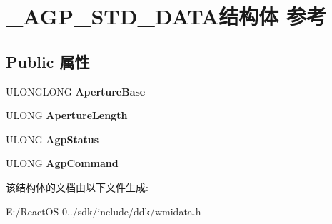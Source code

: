 \hypertarget{struct___a_g_p___s_t_d___d_a_t_a}{}\section{\+\_\+\+A\+G\+P\+\_\+\+S\+T\+D\+\_\+\+D\+A\+T\+A结构体 参考}
\label{struct___a_g_p___s_t_d___d_a_t_a}
\subsection*{Public 属性}
\begin{DoxyCompactItemize}
\item 
\mbox{\label{struct___a_g_p___s_t_d___d_a_t_a_a16f90fe0c4be0dcd60f16f9783bc5302}} 
U\+L\+O\+N\+G\+L\+O\+NG {\bfseries Aperture\+Base}
\item 
\mbox{\label{struct___a_g_p___s_t_d___d_a_t_a_acf113f859722e136084d875d0cd1ab72}} 
U\+L\+O\+NG {\bfseries Aperture\+Length}
\item 
\mbox{\label{struct___a_g_p___s_t_d___d_a_t_a_a0f8d4d5672289b4c316c477f89338b96}} 
U\+L\+O\+NG {\bfseries Agp\+Status}
\item 
\mbox{\label{struct___a_g_p___s_t_d___d_a_t_a_a7b6c2076d0f82d5f457c40fe4b94e55f}} 
U\+L\+O\+NG {\bfseries Agp\+Command}
\end{DoxyCompactItemize}


该结构体的文档由以下文件生成\+:\begin{DoxyCompactItemize}
\item 
E\+:/\+React\+O\+S-\/0../sdk/include/ddk/wmidata.\+h\end{DoxyCompactItemize}

